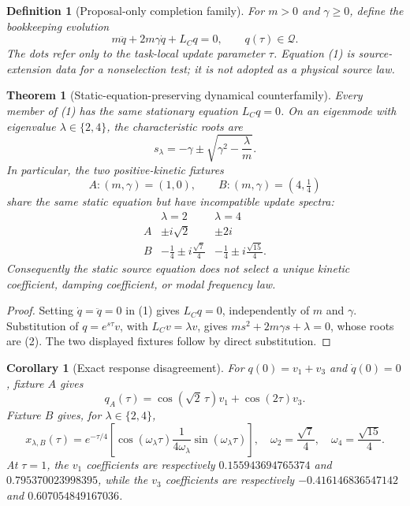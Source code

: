 \documentclass[11pt]{article}
\newtheorem{definition}{Definition}
\newtheorem{theorem}{Theorem}
\newtheorem{corollary}{Corollary}
\newcommand{\Qspace}{\mathcal Q}
\newcommand{\LC}{L_C}
\begin{document}
\begin{definition}[Proposal-only completion family]
For \(m>0\) and \(\gamma\geq0\), define the bookkeeping evolution
\[
  m\ddot q+2m\gamma\dot q+\LC q=0,
  \qquad q(\tau)\in\Qspace .
  \tag{1}
\]
The dots refer only to the task-local update parameter \(\tau\).  Equation
(1) is source-extension data for a nonselection test; it is not adopted as a
physical source law.
\end{definition}

\begin{theorem}[Static-equation-preserving dynamical counterfamily]
\label{thm:counterfamily}
Every member of (1) has the same stationary equation \(\LC q=0\).  On an
eigenmode with eigenvalue \(\lambda\in\{2,4\}\), the characteristic roots are
\[
  s_\lambda=-\gamma\pm
  \sqrt{\gamma^2-\frac{\lambda}{m}} .
  \tag{2}
\]
In particular, the two positive-kinetic fixtures
\[
  A:(m,\gamma)=(1,0),\qquad
  B:(m,\gamma)=(4,\tfrac14)
\]
share the same static equation but have incompatible update spectra:
\[
\begin{array}{c|cc}
 &\lambda=2&\lambda=4\\ \hline
A&\pm i\sqrt2&\pm2i\\
B&-\tfrac14\pm i\tfrac{\sqrt7}{4}
  &-\tfrac14\pm i\tfrac{\sqrt{15}}4 .
\end{array}
\]
Consequently the static source equation does not select a unique kinetic
coefficient, damping coefficient, or modal frequency law.
\end{theorem}

\begin{proof}
Setting \(\dot q=\ddot q=0\) in (1) gives \(\LC q=0\), independently of
\(m\) and \(\gamma\).  Substitution of \(q=e^{s\tau}v\), with
\(\LC v=\lambda v\), gives
\(m s^2+2m\gamma s+\lambda=0\), whose roots are (2).
The two displayed fixtures follow by direct substitution.
\end{proof}

\begin{corollary}[Exact response disagreement]
For \(q(0)=v_1+v_3\) and \(\dot q(0)=0\), fixture \(A\) gives
\[
 q_A(\tau)=\cos(\sqrt2\,\tau)v_1+\cos(2\tau)v_3 .
\]
Fixture \(B\) gives, for \(\lambda\in\{2,4\}\),
\[
 x_{\lambda,B}(\tau)=e^{-\tau/4}
 \left[
 \cos(\omega_\lambda\tau)
 \frac{1}{4\omega_\lambda}\sin(\omega_\lambda\tau)
 \right],
\quad
\omega_2=\frac{\sqrt7}{4},\quad
\omega_4=\frac{\sqrt{15}}4 .
\]
At \(\tau=1\), the \(v_1\) coefficients are respectively
\(0.155943694765374\) and \(0.795370023998395\), while the \(v_3\)
coefficients are respectively \(-0.416146836547142\) and
\(0.607054849167036\).
\end{corollary}
\end{document}
